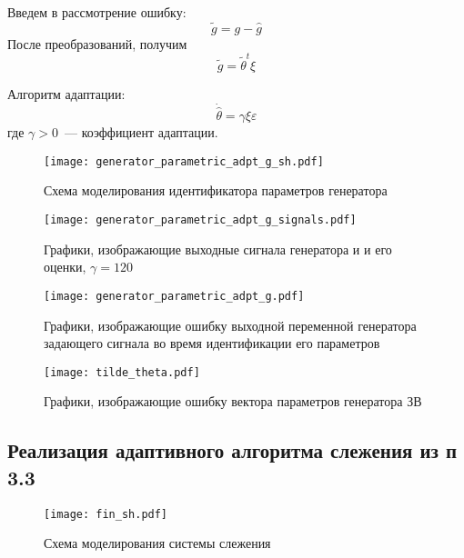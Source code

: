 Введем в рассмотрение ошибку:
\begin{equation}
	\tilde{g} = g - \hat{g}
\end{equation}
После преобразований, получим
\begin{equation}
	\tilde{g} = \tilde{\theta}^t \xi
\end{equation}

Алгоритм адаптации:
\begin{equation}
	\dot{\hat{\theta}} = \gamma \xi \varepsilon
\end{equation}
где $\gamma > 0$~--- коэффициент адаптации.

\begin{figure}[h!]
	\centering
	\texttt{[image: generator\_parametric\_adpt\_g\_sh.pdf]}
	\caption{Схема моделирования идентификатора параметров генератора}
	\label{fg:generator_parametric_adapt_sh}
\end{figure}

\begin{figure}[h!]
	\centering
	\texttt{[image: generator\_parametric\_adpt\_g\_signals.pdf]}
	\caption{Графики, изображающие выходные сигнала генератора и и его оценки, $\gamma = 120$}
	\label{fg:generator_parametric_adapt_signals}
\end{figure}

\begin{figure}[h!]
	\centering
	\texttt{[image: generator\_parametric\_adpt\_g.pdf]}
	\caption{Графики, изображающие ошибку выходной переменной генератора задающего сигнала во время идентификации его параметров}
	\label{fg:generator_parametric_adapt}
\end{figure}
\clearpage
\begin{figure}[h!]
	\centering
	\texttt{[image: tilde\_theta.pdf]}
	\caption{Графики, изображающие ошибку вектора параметров генератора ЗВ}
	\label{fg:generator_parametric_adapt_theta}
\end{figure}


\subsection{Реализация адаптивного алгоритма слежения из п 3.3}

\begin{figure}[h!]
	\centering
	\texttt{[image: fin\_sh.pdf]}
	\caption{Схема моделирования системы слежения}
	\label{fg:fin}
\end{figure}

